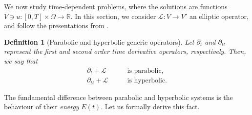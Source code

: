 \documentclass{article}
\newtheorem{definition}{Definition}
\newcommand{\R}{\mathbb{R}}
\begin{document}
We now study time-dependent problems, where the solutions are functions $V\ni u:[0,T]\times \Omega\to \R$. In this section, we consider $\mathcal{L}:V\to V'$ an elliptic operator, and follow the presentations from \cite{thomee2007galerkin,quarteroni2008numerical}.

\begin{definition}[Parabolic and hyperbolic generic operators]
    Let $\partial_t$ and $\partial_{tt}$ represent the first and second order time derivative operators, respectively. Then, we say that
    \begin{align*}
        \partial_t + \mathcal{L} &\qquad \text{is parabolic,}\\
        \partial_{tt} + \mathcal{L} &\qquad \text{is hyperbolic.}
    \end{align*}
\end{definition}
The fundamental difference between parabolic and hyperbolic systems is the behaviour of their \textit{energy} $E(t)$. Let us formally derive this fact.
\end{document}
